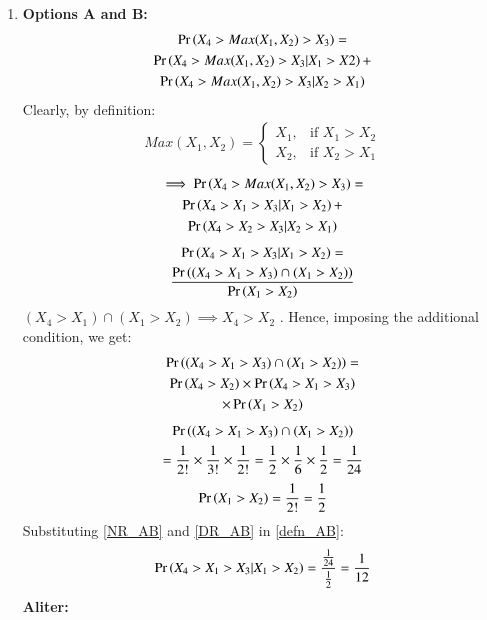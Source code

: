 \documentclass[journal,12pt,twocolumn]{IEEEtran}
\begin{document}
\begin{enumerate}
    \item \textbf{Options A and B:}
\begin{multline}
    \Pr\left(X_4 > Max(X_1,X_2) > X_3\right) = \\\Pr\left(X_4 > Max(X_1,X_2) > X_3 | X_1>X2 \right) + \\ \Pr\left(X_4 > Max(X_1,X_2) > X_3 | X_2>X_1 \right)
\end{multline}
Clearly, by definition:
\begin{align}
  Max(X_1,X_2) = 
  \begin{cases}
      X_1, & \text{if } X_1>X_2\\
    X_2, & \text{if } X_2>X_1
  \end{cases}
\end{align}
\begin{multline}
    \implies \Pr\left(X_4 > Max(X_1,X_2) > X_3\right) = \\\Pr\left(X_4 > X_1 > X_3| X_1 > X_2 \right) + \\ \Pr\left(X_4 > X_2 > X_3| X_2 > X_1\right)
\end{multline}
\begin{multline}
    \Pr\left(X_4 > X_1 > X_3 | X_1 > X_2 \right) = \\ \frac{\Pr\left((X_4 > X_1 > X_3) \cap (X_1 > X_2) \right)}{\Pr\left(X_1>X_2\right)} \label{defn_AB}
\end{multline}
$(X_4>X_1) \cap (X_1>X_2) \implies X_4>X_2$ . Hence, imposing the additional condition, we get:
\begin{multline}
    \Pr\left((X_4 > X_1 > X_3) \cap (X_1 > X_2)\right) = \\\Pr\left(X_4>X_2\right) \times \Pr\left(X_4 > X_1 > X_3\right)\\ \times \Pr\left(X_1 > X_2\right)
\end{multline}
\begin{multline}
 \Pr\left((X_4 > X_1 > X_3) \cap (X_1 > X_2)\right)\\
    = \frac{1}{2!}\times \frac{1}{3!}\times \frac{1}{2!}
    = \frac{1}{2}\times \frac{1}{6}\times \frac{1}{2}= \frac{1}{24} \label{NR_AB}
\end{multline}
\begin{align}
    \Pr\left(X_1>X_2\right) = \frac{1}{2!} = \frac{1}{2} \label{DR_AB}
\end{align}
Substituting \eqref{NR_AB} and \eqref{DR_AB} in \eqref{defn_AB}:
\begin{align}
    \Pr\left(X_4 > X_1 > X_3 | X_1 > X_2 \right) = \dfrac{\frac{1}{24}}{\frac{1}{2}} = \frac{1}{12}
\end{align}
\textbf{Aliter:}\\

\end{enumerate}
\end{document}
